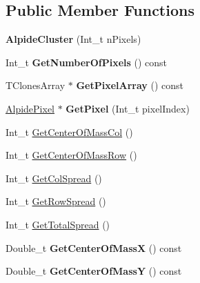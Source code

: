\subsection*{Public Member Functions}
\begin{DoxyCompactItemize}
\item 
\mbox{\label{class_alpide_cluster_af821b31fed68e996a6bb53c373687efc}} 
{\bfseries Alpide\+Cluster} (Int\+\_\+t n\+Pixels)
\item 
\mbox{\label{class_alpide_cluster_a008fae4dd8d87b1f5b21c308628cfaff}} 
Int\+\_\+t {\bfseries Get\+Number\+Of\+Pixels} () const
\item 
\mbox{\label{class_alpide_cluster_adb8cc438b171a4caba741eaed62a6839}} 
T\+Clones\+Array $\ast$ {\bfseries Get\+Pixel\+Array} () const
\item 
\mbox{\label{class_alpide_cluster_a007d219e1928cc3f5625565cab061d37}} 
\mbox{\hyperlink{class_alpide_pixel}{Alpide\+Pixel}} $\ast$ {\bfseries Get\+Pixel} (Int\+\_\+t pixel\+Index)
\item 
Int\+\_\+t \mbox{\hyperlink{class_alpide_cluster_ae55b212b27e3675ae39fefe0609e64bc}{Get\+Center\+Of\+Mass\+Col}} ()
\item 
Int\+\_\+t \mbox{\hyperlink{class_alpide_cluster_aa6a01c099653dc06d5b9b4dbbbc0bd40}{Get\+Center\+Of\+Mass\+Row}} ()
\item 
Int\+\_\+t \mbox{\hyperlink{class_alpide_cluster_afcca84fccea029577b9c6000b9150ca7}{Get\+Col\+Spread}} ()
\item 
Int\+\_\+t \mbox{\hyperlink{class_alpide_cluster_a3a013131ed160c17cace1ba9390678f7}{Get\+Row\+Spread}} ()
\item 
Int\+\_\+t \mbox{\hyperlink{class_alpide_cluster_ad956ba719becb064aa333b53b5e8044e}{Get\+Total\+Spread}} ()
\item 
\mbox{\label{class_alpide_cluster_a17c57fda1cdece3403a5cca96b9b8554}} 
Double\+\_\+t {\bfseries Get\+Center\+Of\+MassX} () const
\item 
\mbox{\label{class_alpide_cluster_a13544622bdc93308485b97b8aaf27c75}} 
Double\+\_\+t {\bfseries Get\+Center\+Of\+MassY} () const
\item 

\end{DoxyCompactItemize}
